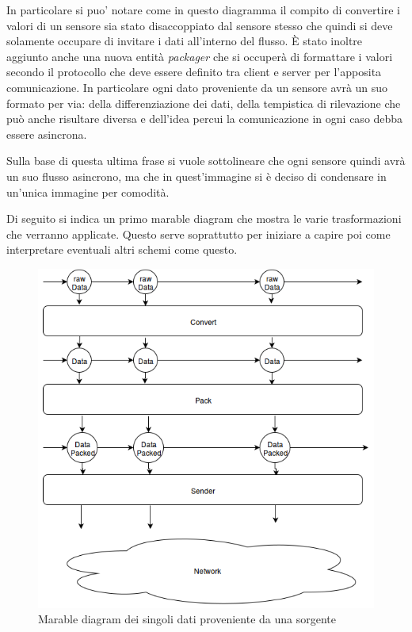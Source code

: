 In particolare si puo' notare come in questo diagramma il compito di convertire i valori di un sensore sia stato disaccoppiato dal sensore stesso che quindi si deve solamente occupare di invitare i dati all'interno del flusso. \`E stato inoltre aggiunto anche una nuova entit\`a \textit{packager} che si occuper\`a di formattare i valori secondo il protocollo che deve essere definito tra client e server per l'apposita comunicazione. In particolare ogni dato proveniente da un sensore avr\`a un suo formato per via: della differenziazione dei dati, della tempistica di rilevazione che pu\`o anche risultare diversa e dell'idea percui la comunicazione in ogni caso debba essere asincrona.

Sulla base di questa ultima frase si vuole sottolineare che ogni sensore quindi avr\`a un suo flusso asincrono, ma che in quest'immagine si \`e deciso di condensare in un'unica immagine per comodit\`a.

Di seguito si indica un primo marable diagram che mostra le varie trasformazioni che verranno applicate. Questo serve soprattutto per iniziare a capire poi come interpretare eventuali altri schemi come questo.

\begin{figure}[ht]
\centering
\includegraphics[scale=0.7]{Figures/LogicArchitecture/EmbeddedSystem/MarableDiagram}
\caption{Marable diagram dei singoli dati proveniente da una sorgente}
\end{figure}


